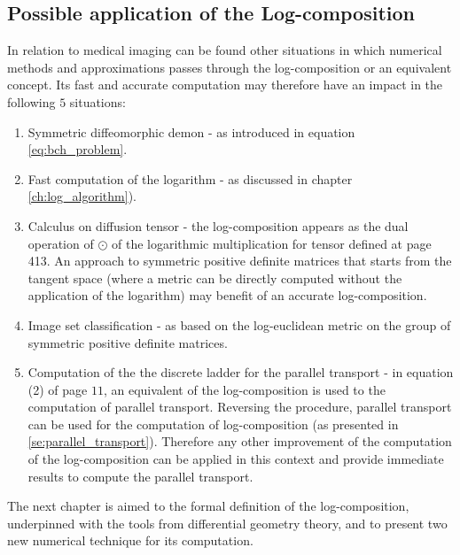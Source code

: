 \subsection{Possible application of the Log-composition}
In relation to medical imaging can be found other situations in which numerical methods and approximations passes through the log-composition or an equivalent concept.
Its fast and accurate computation may therefore have an impact in the following $5$ situations:
\begin{enumerate}
	\item Symmetric diffeomorphic demon \cite{vercauteren08} - as introduced in equation \ref{eq:bch_problem}.
	\item Fast computation of the logarithm \cite{Bossa:08} - as discussed in chapter \ref{ch:log_algorithm}).
	\item Calculus on diffusion tensor \cite{Arsigny:MRM:06} - the log-composition appears as the dual operation of $\odot$ of the logarithmic multiplication for tensor defined at page 413. An approach to symmetric positive definite matrices that starts from the tangent space (where a metric can be directly computed without the application of the logarithm) may benefit of an accurate log-composition.  
	\item Image set classification \cite{huanglog} - as based on the log-euclidean metric on the group of symmetric positive definite matrices.
	\item Computation of the the discrete ladder for the parallel transport\cite{Lorenzi:discrete_ladders:14} - in equation (2) of page $11$, an equivalent of the log-composition is used to the computation of parallel transport. Reversing the procedure, parallel transport can be used for the computation of log-composition (as presented in \ref{se:parallel_transport}). Therefore any other improvement of the computation of the log-composition can be applied in this context and provide immediate results to compute the parallel transport.
\end{enumerate}	
	
The next chapter is aimed to the formal definition of the log-composition, underpinned with the tools from differential geometry theory, and to present two new numerical technique for its computation.








